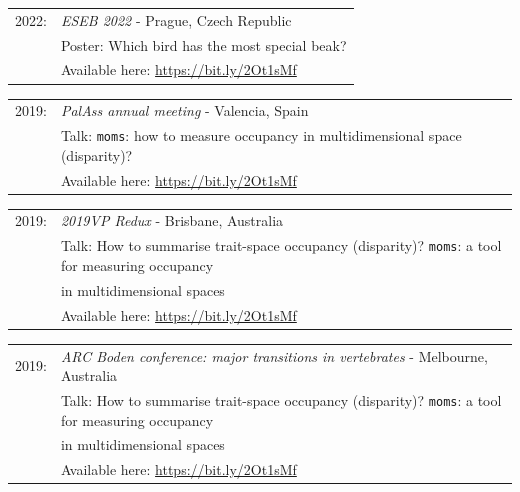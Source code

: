 \documentclass[10pt,a4paper]{article}
\begin{document}
{\begin{tabular}{ll}
2022: & \textit{ESEB 2022} - Prague, Czech Republic\\
      & Poster: Which bird has the most special beak?\\
      & Available here: \href{https://figshare.com/articles/Shifting_spaces_which_disparity_or_dissimilarity_metrics_best_summarise_occupancy_in_multidimensional_spaces_/9922961}{https://bit.ly/2Ot1sMf}\\
\end{tabular}

\begin{tabular}{ll}
2019: & \textit{PalAss annual meeting} - Valencia, Spain\\
      & Talk: \texttt{moms}: how to measure occupancy in multidimensional space (disparity)?\\
      & Available here: \href{https://figshare.com/articles/Shifting_spaces_which_disparity_or_dissimilarity_metrics_best_summarise_occupancy_in_multidimensional_spaces_/9922961}{https://bit.ly/2Ot1sMf}\\
\end{tabular}
\begin{tabular}{ll}
2019: & \textit{2019VP Redux} - Brisbane, Australia\\
      & Talk: How to summarise trait-space occupancy (disparity)? \texttt{moms}: a tool for measuring occupancy\\
      & in multidimensional spaces\\
      & Available here: \href{https://figshare.com/articles/Shifting_spaces_which_disparity_or_dissimilarity_metrics_best_summarise_occupancy_in_multidimensional_spaces_/9922961}{https://bit.ly/2Ot1sMf}\\
\end{tabular}
\begin{tabular}{ll}    
2019: & \textit{ARC Boden conference: major transitions in vertebrates} - Melbourne, Australia\\
      & Talk: How to summarise trait-space occupancy (disparity)? \texttt{moms}: a tool for measuring occupancy\\
      & in multidimensional spaces\\
      & Available here: \href{https://figshare.com/articles/Shifting_spaces_which_disparity_or_dissimilarity_metrics_best_summarise_occupancy_in_multidimensional_spaces_/9922961}{https://bit.ly/2Ot1sMf}\\

\end{tabular}}
\end{document}
